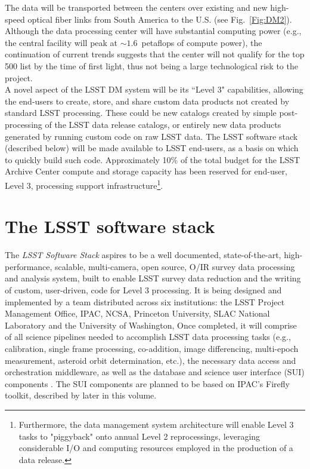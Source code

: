 \documentclass[11pt,twoside]{article}
\begin{document}
The data will be transported between the centers over existing and new high-speed optical fiber
links from South America to the U.S. (see Fig.~\ref{Fig:DM2}).
Although the data processing center will have substantial computing
power (e.g., the central facility will peak at $\sim 1.6$~petaflops of
compute power), the continuation of current trends suggests that the center will
not qualify for the top 500 list by the time of first light, thus not
being a large technological risk to the project.
\\

A novel aspect of the LSST DM system will be its ``Level 3"
capabilities, allowing the end-users to create, store, and share
custom data products not created by standard LSST processing. These
could be new catalogs created by simple post-processing of the LSST
data release catalogs, or entirely new data products generated by
running custom code on raw LSST data. The LSST software stack (described
below) will be made available to LSST end-users, as a basis on which
to quickly build such code. Approximately 10\% of the total
budget for the LSST Archive Center compute and storage capacity has
been reserved for end-user, Level 3, processing support
infrastructure\footnote{Furthermore, the data management system
architecture will enable Level 3 tasks to "piggyback" onto annual
Level 2 reprocessings, leveraging considerable I/O and
computing resources employed in the production of a data release.}.

\section{The LSST software stack}
\label{sec:dmstack}

The {\em LSST Software Stack} aspires to be a well documented, state-of-the-art,
high-performance, scalable, multi-camera, open source, O/IR survey
data processing and analysis system, built to enable LSST survey data
reduction and the writing of custom, user-driven, code for Level 3
processing. It is being designed and implemented by a team distributed
across six institutions: the LSST Project Management Office, IPAC, NCSA, 
Princeton University, SLAC National Laboratory and the University
of Washington, Once completed, it will comprise of
all science pipelines \citep{LDM-151, LDM-156} needed to accomplish LSST data processing tasks
(e.g., calibration, single frame processing, co-addition, image
differencing, multi-epoch measurement, asteroid orbit determination,
etc.), the necessary data
access and orchestration middleware, as well as the 
database \citep{LDM-135} and science user interface (SUI) components \citep{LDM-131}.
The SUI components are planned to be based on IPAC's Firefly toolkit,
described by \citet{O10-1_adassxxv} later in this volume.
\end{document}
